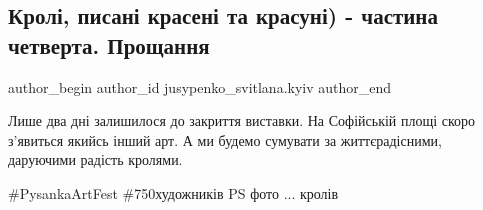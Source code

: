  
 
 
 
 
 
\subsection{Кролі, писані красені та красуні) - частина четверта. Прощання}
\label{sec:20_04_2018.fb.jusypenko_svitlana.kyiv.1.kroli_4_farewell}
 
\ifcmt
 author_begin
   author_id jusypenko_svitlana.kyiv
 author_end
\fi

Лише два дні залишилося до закриття виставки. На Софійській площі скоро
з'явиться якийсь інший арт. А ми будемо сумувати за життєрадісними, даруючими
радість кролями. 

\#PysankaArtFest \#750художників PS фото ... кролів
